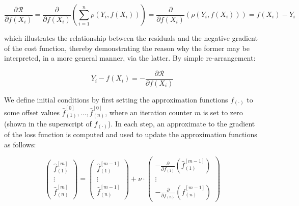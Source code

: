 \documentclass{article}
\begin{document}
\begin{equation}
  \label{eqn-loss-derivative}
  \frac{\partial \mathcal{R}}{\partial f(X_i)} = \frac{\partial}{\partial f(X_i)}\left(  \sum_{i=1}^{n} \rho(Y_i, f(X_i)) \right) = \frac{\partial}{\partial f(X_i)}\left(  \rho(Y_i, f(X_i)) \right) = f(X_i) - Y_i
\end{equation}

\vspace{3mm}

which illustrates the relationship between the residuals and the negative gradient of the cost function, thereby demonstrating the reason why the former may be interpreted, in a more general manner, via the latter. By simple re-arrangement:

\begin{equation}
  Y_i - f(X_i) = - \frac{\partial \mathcal{R}}{\partial f(X_i)}
  \label{eqn-residuals-loss}
\end{equation}

\vspace{3mm}

We define initial conditions by first setting the approximation functions $f_{(\cdot)}$ to some offset values $\hat f_{(1)}^{[0]}, … ,\hat f_{(n)}^{[0]}$, where an iteration counter $m$ is set to zero (shown in the superscript of $f_{(\cdot)}$). In each step, an approximate to the gradient of the loss function is computed and used to update the approximation functions as follows:

\begin{equation}
  \label{eqn-naive-increment}
  \left(  
    \begin{array}{c}
      \hat{f}_{(1)}^{[m]} \\           
      \vdots \\
      \hat{f}_{(n)}^{[m]}
    \end{array}
  \right) =
  \left(  
    \begin{array}{c}
      \hat{f}_{(1)}^{[m-1]} \\           
      \vdots \\
      \hat{f}_{(n)}^{[m-1]}
    \end{array} 
  \right) +
  \nu \cdot 
  \left(
    \begin{array}{c}
      - \frac{\partial}{\partial f_{(1)}}(\hat{f}_{(1)}^{[m-1]}) \\ 
      \vdots \\
      - \frac{\partial}{\partial f_{(n)}}(\hat{f}_{(n)}^{[m-1]})
    \end{array}
  \right)
\end{equation}
\end{document}

